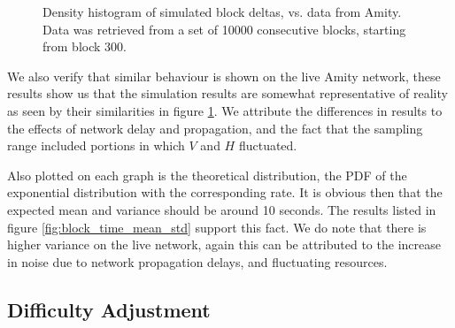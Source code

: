 \begin{figure}[h]
    \centering
    \qquad
    \caption{Density histogram of simulated block deltas, vs. data from Amity. Data was retrieved from a set of 10000 consecutive blocks, starting from block 300.}
    \label{fig:delta_histogram}
\end{figure}

We also verify that similar behaviour is shown on the live Amity network, these results show us
that the simulation results are somewhat representative of reality as seen by their similarities
in figure \ref{fig:delta_histogram}. We attribute
the differences in results to the effects of network delay and propagation, and the fact that the sampling
range included portions in which $V$ and $H$ fluctuated.

Also plotted on each graph is the theoretical distribution, the PDF of the exponential distribution with
the corresponding rate. It is obvious then that the expected mean and variance should be around 10 seconds.
The results listed in figure \ref{fig:block_time_mean_std} support this fact. We do note that there is higher variance
on the live network, again this can be attributed to the increase in noise due to network propagation
delays, and fluctuating resources.

\subsection{Difficulty Adjustment}

